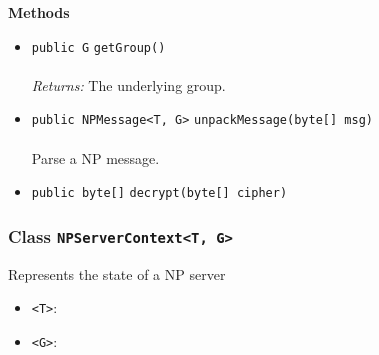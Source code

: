 \textbf{\sffamily Methods}
\begin{itemize}
\item \lstinline|public G| \lstinline|getGroup|\lstinline|()|\\ \\[-0.6em]
\emph{Returns:} The underlying group.



\item \lstinline|public NPMessage<T, G>| \lstinline|unpackMessage|\lstinline|(byte[] msg)|\\ \\[-0.6em]
Parse a NP message.



\item \lstinline|public byte[]| \lstinline|decrypt|\lstinline|(byte[] cipher)| \\[-0.6em]




\end{itemize}

\subsubsection{Class \lstinline|NPServerContext<T, G>|}
Represents the state of a NP server \\
\noindent\begin{minipage}[t]{5cm}
\vspace{0.3em}
\hspace*{2em}
\vspace{0.3em}
\end{minipage}

\begin{itemize}
\item \lstinline|<T>|: 
\item \lstinline|<G>|: 
\end{itemize}



